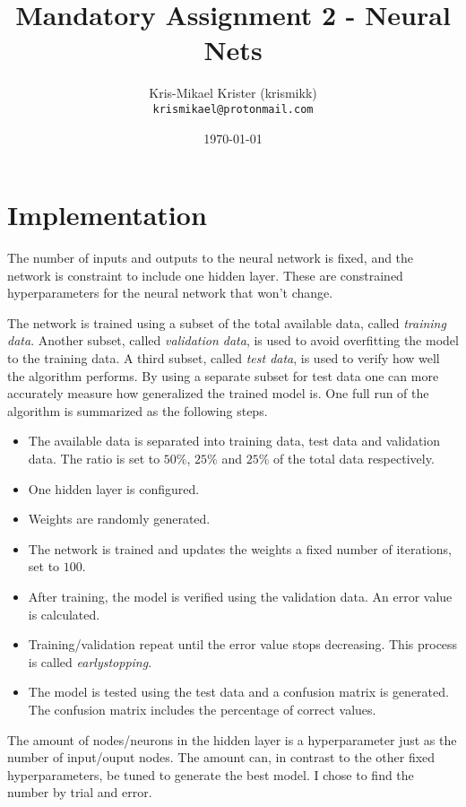 \documentclass{article}
\title{Mandatory Assignment 2 - Neural Nets}
\author{Kris-Mikael Krister (krismikk)\\\texttt{krismikael@protonmail.com}}
\date{\today}
\begin{document}
\maketitle

\section*{Implementation}

The number of inputs and outputs to the neural network is fixed, and the network is constraint to include one hidden layer. These are constrained hyperparameters for the neural network that won't change.

The network is trained using a subset of the total available data, called \emph{training data}. Another subset, called \emph{validation data}, is used to avoid overfitting the model to the training data. A third subset, called \emph{test data}, is used to verify how well the algorithm performs. By using a separate subset for test data one can more accurately measure how generalized the trained model is. One full run of the algorithm is summarized as the following steps.

\begin{itemize}
    \item The available data is separated into training data, test data and validation data. The ratio is set to $50\%$, $25\%$ and $25\%$ of the total data respectively.
    \item One hidden layer is configured.
    \item Weights are randomly generated.
    \item The network is trained and updates the weights a fixed number of iterations, set to $100$.
    \item After training, the model is verified using the validation data. An error value is calculated.
    \item Training/validation repeat until the error value stops decreasing. This process is called \emph{earlystopping}.
    \item The model is tested using the test data and a confusion matrix is generated. The confusion matrix includes the percentage of correct values.
\end{itemize}

\noindent The amount of nodes/neurons in the hidden layer is a hyperparameter just as the number of input/ouput nodes. The amount can, in contrast to the other fixed hyperparameters, be tuned to generate the best model. I chose to find the number by trial and error.
\end{document}
